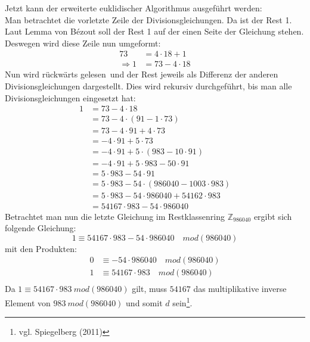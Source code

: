 Jetzt kann der erweiterte euklidischer Algorithmus ausgeführt werden:\\
Man betrachtet die vorletzte Zeile der Divisionsgleichungen. Da ist der Rest 1.\\
Laut Lemma von Bézout soll der Rest 1 auf der einen Seite der Gleichung stehen. Deswegen wird diese Zeile nun umgeformt:
\begin{align*}
73 &= 4 \cdot 18 + 1\\
\Rightarrow 1 &= 73-4\cdot 18
\end{align*}
Nun wird \glqq rückwärts gelesen\grqq~und der Rest jeweils als Differenz der anderen Divisionsgleichungen dargestellt. Dies wird rekursiv durchgeführt, bis man alle Divisionsgleichungen eingesetzt hat:
\begin{align*}
1 &= 73-4\cdot 18\\
  &= 73-4\cdot (91-1\cdot 73)\\
  &= 73-4\cdot91+4\cdot73\\
  &= -4\cdot91+5\cdot73\\
  &= -4\cdot91+5\cdot(983-10\cdot91)\\
  &= -4\cdot91+5\cdot983-50\cdot91\\
  &= 5\cdot983-54\cdot91\\
  &= 5\cdot983-54\cdot(986040-1003\cdot983)\\
  &= 5\cdot983-54\cdot986040+54162\cdot983\\
  &= 54167\cdot983-54\cdot986040
\end{align*}
Betrachtet man nun die letzte Gleichung im Restklassenring $\mathbb{Z}_{986040}$ ergibt sich folgende Gleichung:
\begin{equation*}
1 \equiv54167\cdot983-54\cdot 986040 \quad mod(986040)
\end{equation*}
mit den Produkten:
\begin{align*}
0 &\equiv -54\cdot 986040 \quad mod(986040)\\
1 &\equiv 54167\cdot 983 \quad mod(986040)\\
\end{align*}
Da $1 \equiv 54167\cdot 983~mod(986040)$ gilt, muss $54167$ das multiplikative inverse Element von $983~mod(986040)$ und somit $d$ sein\footnote{vgl. Spiegelberg (2011)}.
